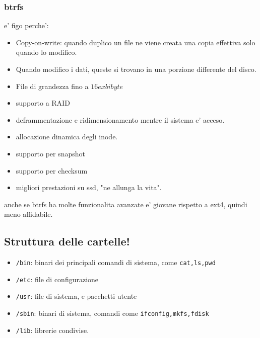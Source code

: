 \subsubsection{btrfs}
e' figo perche':
\begin{itemize}
    \item Copy-on-write: quando duplico un file ne viene creata una copia effettiva solo quando lo modifico.
    \item Quando modifico i dati, queste si trovano in una porzione differente del disco.
    \item File di grandezza fino a $16exbibyte$
    \item supporto a RAID
    \item deframmentazione e ridimensionamento mentre il sistema e' acceso.
    \item allocazione dinamica degli inode.
    \item supporto per snapshot
    \item supporto per checksum
    \item migliori prestazioni su ssd, "ne allunga la vita".
\end{itemize}

anche se btrfs ha molte funzionalita avanzate e' giovane rispetto a ext4, quindi meno affidabile.

\subsection{Struttura delle cartelle!}
\begin{itemize}
    \item \texttt{/bin}: binari dei principali comandi di sistema, come \texttt{cat,ls,pwd}
    \item \texttt{/etc}: file di configurazione
    \item \texttt{/usr}: file di sistema, e pacchetti utente
    \item \texttt{/sbin}: binari di sistema, comandi come \texttt{ifconfig,mkfs,fdisk}
    \item \texttt{/lib}: librerie condivise.
\end{itemize}
